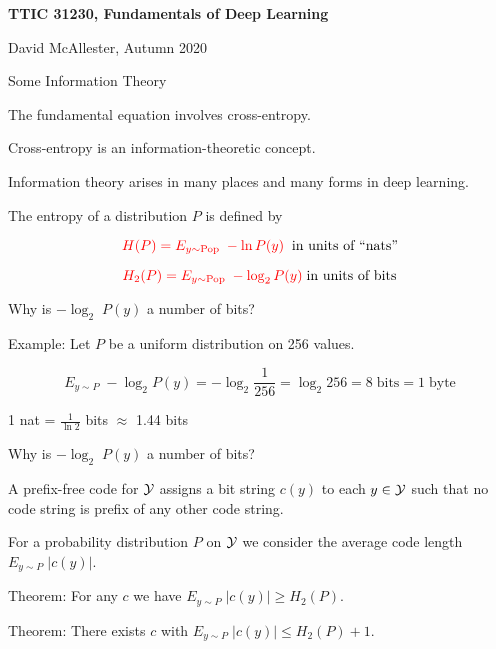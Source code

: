 




{\Huge
  \centerline{\bf TTIC 31230,  Fundamentals of Deep Learning}
  \vfill
  \centerline{David McAllester, Autumn 2020}
  \vfill
\centerline{Some Information Theory}


The fundamental equation involves cross-entropy.

\vfill
Cross-entropy is an information-theoretic concept.

\vfill
Information theory arises in many places and many forms in deep learning.


The entropy of a distribution $P$ is defined by

\vfill
$${\color{red} H(P) = E_{y \sim \mathrm{Pop}} \;- \ln P(y)}\;\;\mbox{in units of ``nats''}$$

\vfill
$${\color{red} H_2(P) = E_{y \sim \mathrm{Pop}} \;- \log_2 P(y)}\; \mbox{in units of bits}$$


Why is $-\log_2\;P(y)$ a number of bits?

\vfill
Example: Let $P$ be a uniform distribution on 256 values.

\vfill
$$E_{y \sim P}\;-\log_2 P(y) = - \log_2 \frac{1}{256} = \log_2 256 = 8\;\mathrm{bits} = 1\;\mathrm{byte}$$

\vfill
\centerline{\color{red} 1 nat = $\frac{1}{\ln 2}$ bits $\approx$ 1.44 bits}


Why is $-\log_2\;P(y)$ a number of bits?

\vfill
A prefix-free code for ${\cal Y}$ assigns a bit string $c(y)$ to each $y \in {\cal Y}$ such that no code string is prefix of any other code string.

\vfill
For a probability distribution $P$ on ${\cal Y}$ we consider the average code length $E_{y \sim P} \;|c(y)|$.

\vfill
Theorem: For any $c$ we have {\color{red} $E_{y \sim P}\;|c(y)| \geq H_2(P)$}.

\vfill
Theorem: There exists $c$ with {\color{red} $E_{y \sim P} \;|c(y)| \leq H_2(P) +1$}.

}
